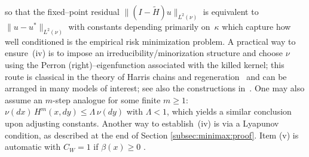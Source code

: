 \documentclass[pdflatex,sn-mathphys-ay]{sn-jnl}%
\numberwithin{equation}{section}
\theoremstyle{thmstyleone}%
\theoremstyle{thmstyletwo}%
\theoremstyle{thmstylethree}%
\begin{document}
so that the fixed–point residual \(\|(I-\tilde{H})u\|_{L^2(\nu)}\) is equivalent to \(\|u-u^*\|_{L^2(\nu)}\) with constants depending primarily on~\(\kappa\) which capture how well conditioned is the empirical risk minimization problem. A practical way to ensure~(iv) is to impose an irreducibility/minorization structure and choose \(\nu\) using the Perron (right)–eigenfunction associated with the killed kernel; this route is classical in the theory of Harris chains and regeneration~\cite{nummelin1984general} and can be arranged in many models of interest; see also the constructions in~\cite{blanchet2016analysis}.  One may also assume an \(m\)-step analogue for some finite \(m\ge 1\): \(\nu(dx)\,H^m(x,dy)\le \Lambda\,\nu(dy)\) with \(\Lambda<1\), which yields a similar conclusion upon adjusting constants. Another way to establish~(iv) is via a Lyapunov condition, as described at the end of Section \ref{subsec:minimax:proof}. Item (v) is automatic with $C_W=1$ if $\beta(x) \geq 0$ .
\end{document}
